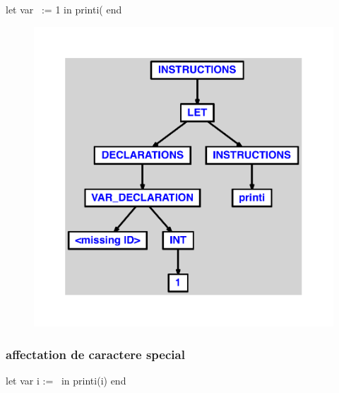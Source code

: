 \documentclass{article}
\begin{document}
\begin{verbatimtab}
let
	var \ := 1
in
	printi(\)
end
\end{verbatimtab}
\begin{figure}[H]\centering\includegraphics[max width=\textwidth]{ast/ast_288.pdf}\end{figure}\subsubsection{affectation de caractere special}
\begin{verbatimtab}
let
	var i := \
in
	printi(i)
end
\end{verbatimtab}
\end{document}
